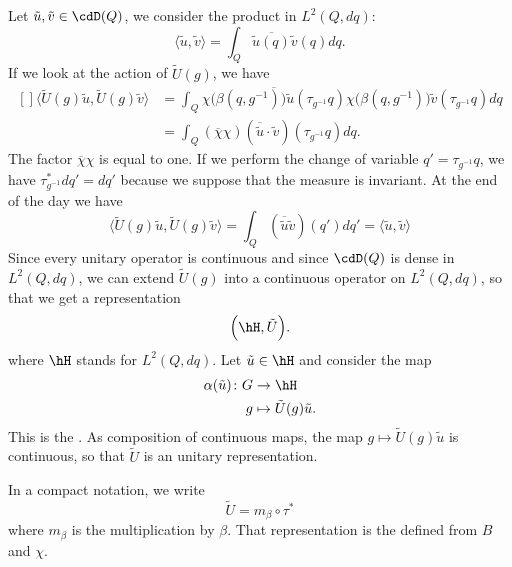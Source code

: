 Let $\tilde u,\tilde v\in\cdD(Q)$, we consider the product in $L^2(Q,dq)$:
\begin{equation}
	\langle \tilde u, \tilde v\rangle =\int_Q\overline{\tilde u(q)}\tilde v(q)dq.
\end{equation}
If we look at the action of $\tilde U(g)$, we have
\begin{equation}
	\begin{aligned}[]
		\langle \tilde U(g)\tilde u, \tilde U(g)\tilde v\rangle &=\int_Q\overline{ \chi\big( \beta(q,g^{-1}) \big)\tilde u(\tau_{g^{-1}}q) }\chi\big( \beta(q,g^{-1}) \big)\tilde v(\tau_{g^{-1}}q)dq\\
		&=\int_Q(\overline{ \chi }\chi)(\overline{ \tilde u }\cdot \tilde v)(\tau_{g^{-1}}q)dq.
	\end{aligned}
\end{equation}
The factor $\overline{ \chi }\chi$ is equal to one. If we perform the change of variable $q'=\tau_{g^{-1}}q$, we have $\tau_{g^{-1}}^*dq'=dq'$ because we suppose that the measure is invariant. At the end of the day we have
\begin{equation}
	\langle \tilde U(g)\tilde u, \tilde U(g)\tilde v\rangle =\int_Q(\overline{ \tilde u }\tilde v)(q')dq'=\langle \tilde u, \tilde v\rangle 
\end{equation}
Since every unitary operator is continuous and since $\cdD(Q)$ is dense in $L^2(Q,dq)$, we can extend $\tilde U(g)$ into a continuous operator on $L^2(Q,dq)$, so that we get a representation
\begin{equation}
	\Big( \hH,\tilde U \Big).
\end{equation}
where $\hH$ stands for $L^2(Q,dq)$. Let $\tilde u\in\hH$ and consider the map
\begin{equation}
	\begin{aligned}
		\alpha(\tilde u)\colon G&\to \hH \\
		g&\mapsto \tilde U(g)\tilde u.
	\end{aligned}
\end{equation}
This is the . As composition of continuous maps, the map $g\mapsto \tilde U(g)\tilde u$ is continuous, so that $\tilde U$ is an unitary representation.

In a compact notation, we write
\begin{equation}
	\tilde U=m_{\beta}\circ\tau^*
\end{equation}
where $m_{\beta}$ is the multiplication by $\beta$. That representation is the  defined from $B$ and $\chi$.


